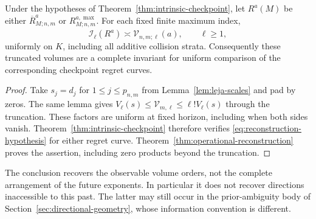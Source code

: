 \begin{corollary}
\label{cor:monomial-operational-recovery}
Under the hypotheses of Theorem~\ref{thm:intrinsic-checkpoint}, let
$R^a(M)$ be either $\overline R^a_{M;n,m}$ or
$R^{a,\max}_{M;n,m}$. For each fixed finite maximum index,
\begin{equation}\label{eq:monomial-operational-recovery}
 \mathcal I_\ell(R^a)\asymp
       \widehat{\mathcal V}_{n,m;\ell}(a),\qquad \ell\ge1,
\end{equation}
uniformly on $K$, including all additive collision strata. Consequently
these truncated volumes are a complete invariant for uniform comparison
of the corresponding checkpoint regret curves.
\end{corollary}
\begin{proof}
Take $s_j=d_j$ for $1\le j\le p_{n,m}$ from
Lemma~\ref{lem:leja-scales} and pad by zeros. The same lemma gives
$V_\ell(s)\le\mathcal V_{m,\ell}\le\ell!V_\ell(s)$ through the
truncation. These factors are uniform at fixed horizon, including when
both sides vanish. Theorem~\ref{thm:intrinsic-checkpoint} therefore
verifies \eqref{eq:reconstruction-hypothesis} for either regret curve.
Theorem~\ref{thm:operational-reconstruction} proves the assertion,
including zero products beyond the truncation.
\end{proof}

The conclusion recovers the observable volume orders, not the complete
arrangement of the future exponents. In particular it does not recover
directions inaccessible to this past. The latter may still occur in the
prior-ambiguity body of Section~\ref{sec:directional-geometry}, whose
information convention is different.

